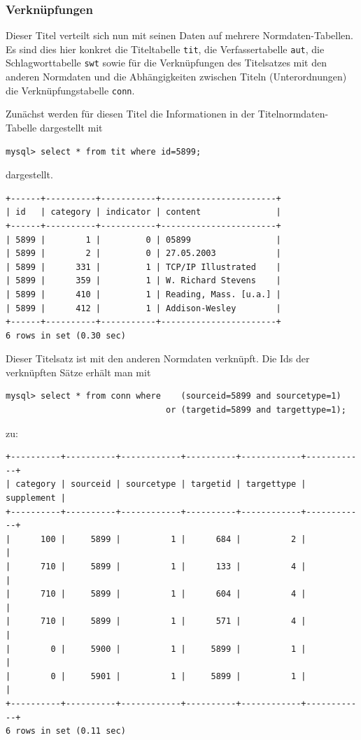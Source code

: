 \documentclass[11pt, twoside, a4paper, BCOR8mm, DIV12, bibtotoc,idxtotoc]{scrbook}
\begin{document}
\subsubsection{Verknüpfungen}
Dieser Titel verteilt sich nun mit seinen Daten auf mehrere
Normdaten-Tabellen. Es sind dies hier konkret die Titeltabelle
\texttt{tit}, die Verfassertabelle \texttt{aut}, die Schlagworttabelle
\texttt{swt} sowie für die Verknüpfungen des Titelsatzes mit den
anderen Normdaten und die Abhängigkeiten zwischen Titeln
(Unterordnungen) die Verknüpfungstabelle \texttt{conn}.

Zunächst werden für diesen Titel die Informationen in der
Titelnormdaten-Tabelle dargestellt mit 

\begin{verbatim}
mysql> select * from tit where id=5899;
\end{verbatim}

dargestellt.

\begin{verbatim}
+------+----------+-----------+-----------------------+
| id   | category | indicator | content               |
+------+----------+-----------+-----------------------+
| 5899 |        1 |         0 | 05899                 |
| 5899 |        2 |         0 | 27.05.2003            |
| 5899 |      331 |         1 | TCP/IP Illustrated    |
| 5899 |      359 |         1 | W. Richard Stevens    |
| 5899 |      410 |         1 | Reading, Mass. [u.a.] |
| 5899 |      412 |         1 | Addison-Wesley        |
+------+----------+-----------+-----------------------+
6 rows in set (0.30 sec)
\end{verbatim}


Dieser Titelsatz ist mit den anderen Normdaten verknüpft. Die Ids der
verknüpften Sätze erhält man mit

\begin{verbatim}
mysql> select * from conn where    (sourceid=5899 and sourcetype=1) 
                                or (targetid=5899 and targettype=1);
\end{verbatim}

zu:

\begin{verbatim}
+----------+----------+------------+----------+------------+------------+
| category | sourceid | sourcetype | targetid | targettype | supplement |
+----------+----------+------------+----------+------------+------------+
|      100 |     5899 |          1 |      684 |          2 |            |
|      710 |     5899 |          1 |      133 |          4 |            |
|      710 |     5899 |          1 |      604 |          4 |            |
|      710 |     5899 |          1 |      571 |          4 |            |
|        0 |     5900 |          1 |     5899 |          1 |            |
|        0 |     5901 |          1 |     5899 |          1 |            |
+----------+----------+------------+----------+------------+------------+
6 rows in set (0.11 sec)
\end{verbatim}
\end{document}
